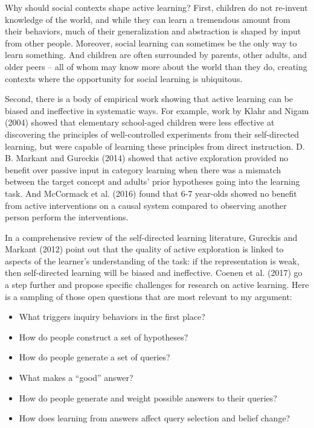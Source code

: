 \documentclass[english,floatsintext,man]{apa6}
\providecommand{\tightlist}{%
  \setlength{\itemsep}{0pt}\setlength{\parskip}{0pt}}
\theoremstyle{definition}
\theoremstyle{definition}
\theoremstyle{definition}
\theoremstyle{remark}
\begin{document}
Why should social contexts shape active learning? First, children do not
re-invent knowledge of the world, and while they can learn a tremendous
amount from their behaviors, much of their generalization and
abstraction is shaped by input from other people. Moreover, social
learning can sometimes be the only way to learn something. And children
are often surrounded by parents, other adults, and older peers -- all of
whom may know more about the world than they do, creating contexts where
the opportunity for social learning is ubiquitous.

Second, there is a body of empirical work showing that active learning
can be biased and ineffective in systematic ways. For example, work by
Klahr and Nigam (2004) showed that elementary school-aged children were
less effective at discovering the principles of well-controlled
experiments from their self-directed learning, but were capable of
learning these principles from direct instruction. D. B. Markant and
Gureckis (2014) showed that active exploration provided no benefit over
passive input in category learning when there was a mismatch between the
target concept and adults' prior hypotheses going into the learning
task. And McCormack et al. (2016) found that 6-7 year-olds showed no
benefit from active interventions on a causal system compared to
observing another person perform the interventions.

In a comprehensive review of the self-directed learning literature,
Gureckis and Markant (2012) point out that the quality of active
exploration is linked to aspects of the learner's understanding of the
task: if the representation is weak, then self-directed learning will be
biased and ineffective. Coenen et al. (2017) go a step further and
propose specific challenges for research on active learning. Here is a
sampling of those open questions that are most relevant to my argument:

\begin{itemize}
\tightlist
\item
  What triggers inquiry behaviors in the first place?
\item
  How do people construct a set of hypotheses?
\item
  How do people generate a set of queries?
\item
  What makes a \enquote{good} answer?
\item
  How do people generate and weight possible answers to their queries?
\item
  How does learning from answers affect query selection and belief
  change?
\end{itemize}
\end{document}
